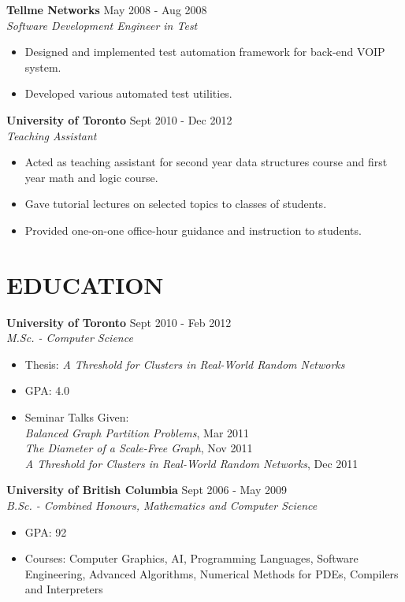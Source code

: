 \documentclass[line,margin]{res}
\begin{document}
\begin{resume}
    {\bf Tellme Networks} \hfill May 2008 - Aug 2008 \\
    {\sl Software Development Engineer in Test}
                 \begin{itemize}  \itemsep -2pt %
                 \item Designed and implemented test automation framework for back-end VOIP system.\item Developed various automated test utilities.
                \end{itemize}
  
    {\bf University of Toronto} \hfill Sept 2010 - Dec 2012 \\
    {\sl Teaching Assistant}
                 \begin{itemize}  \itemsep -2pt %
                 \item Acted as teaching assistant for second year data structures course and first year math and logic course.\item Gave tutorial lectures on selected topics to classes of students.\item Provided one-on-one office-hour guidance and instruction to students.
                \end{itemize}
  

\section{EDUCATION}

    {\bf University of Toronto} \hfill Sept 2010 - Feb 2012 \\
    {\sl M.Sc. - Computer Science}
                 \begin{itemize}  \itemsep -2pt %
                 \item Thesis: \textit{A Threshold for Clusters in Real-World Random Networks}\item GPA: 4.0 \item Seminar Talks Given:
          \\ \textit{Balanced Graph Partition Problems}, Mar 2011
          \\ \textit{The Diameter of a Scale-Free Graph}, Nov 2011
          \\ \textit{A Threshold for Clusters in Real-World Random Networks}, Dec 2011
                \end{itemize}
  
    {\bf University of British Columbia} \hfill Sept 2006 - May 2009 \\
    {\sl B.Sc. - Combined Honours, Mathematics and Computer Science}
                 \begin{itemize}  \itemsep -2pt %
                 \item GPA: 92\item Courses: Computer Graphics, AI, Programming Languages, Software Engineering, Advanced Algorithms, Numerical Methods for PDEs, Compilers and Interpreters 
                \end{itemize}
  


\end{resume}
\end{document}
